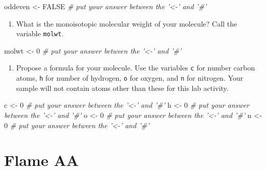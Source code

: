 \documentclass[]{tufte-book}
\newenvironment{Shaded}{}{}
\newcommand{\CommentTok}[1]{\textcolor[rgb]{0.38,0.63,0.69}{\textit{#1}}}
\newcommand{\DecValTok}[1]{\textcolor[rgb]{0.25,0.63,0.44}{#1}}
\newcommand{\NormalTok}[1]{#1}
\newcommand{\OtherTok}[1]{\textcolor[rgb]{0.00,0.44,0.13}{#1}}
\newcommand{\StringTok}[1]{\textcolor[rgb]{0.25,0.44,0.63}{#1}}
\providecommand{\tightlist}{%
  \setlength{\itemsep}{0pt}\setlength{\parskip}{0pt}}
\begin{document}
\begin{Shaded}
\begin{Highlighting}[]
\NormalTok{oddeven <-}\StringTok{ }\OtherTok{FALSE}     \CommentTok{# put your answer between the '<-' and '#'}
\end{Highlighting}
\end{Shaded}

\begin{enumerate}
\def\labelenumi{\arabic{enumi}.}
\setcounter{enumi}{5}
\tightlist
\item
  What is the monoisotopic molecular weight of your molecule? Call the variable \texttt{molwt}.
\end{enumerate}

\begin{Shaded}
\begin{Highlighting}[]
\NormalTok{molwt <-}\StringTok{ }\DecValTok{0}     \CommentTok{# put your answer between the '<-' and '#'}
\end{Highlighting}
\end{Shaded}

\begin{enumerate}
\def\labelenumi{\arabic{enumi}.}
\setcounter{enumi}{6}
\tightlist
\item
  Propose a formula for your molecule. Use the variables \texttt{c} for number carbon atoms, \texttt{h} for number of hydrogen, \texttt{o} for oxygen, and \texttt{n} for nitrogen. Your sample will not contain atoms other than these for this lab activity.
\end{enumerate}

\begin{Shaded}
\begin{Highlighting}[]
\NormalTok{c <-}\StringTok{ }\DecValTok{0}     \CommentTok{# put your answer between the '<-' and '#'}
\NormalTok{h <-}\StringTok{ }\DecValTok{0}     \CommentTok{# put your answer between the '<-' and '#'}
\NormalTok{o <-}\StringTok{ }\DecValTok{0}     \CommentTok{# put your answer between the '<-' and '#'}
\NormalTok{n <-}\StringTok{ }\DecValTok{0}     \CommentTok{# put your answer between the '<-' and '#'}
\end{Highlighting}
\end{Shaded}

\newpage

\hypertarget{am-faas}{%
\section{Flame AA}\label{am-faas}}
\end{document}
